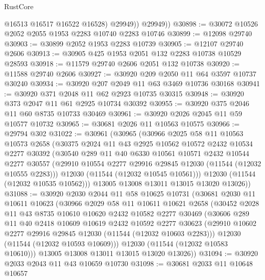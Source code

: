\begin{lexlean}{RustCore}
\begin{coremodule}
              @16513
              @16517
              @16522
              @16528)
            @29949))
        @29949))
@30898 := @30072 @10526 @2052 @2055 @1953 @2283 @10740 @2283 @10746
@30899 := @12098 @29740
@30903 := @30899 @2052 @1953 @2283 @10739
@30905 := @12107 @29740 @2606
@30913 := @30905 @425 @1953 @2051 @132 @2283 @10738 @10529 @28593
@30918 := @11579 @29740 @2606 @2051 @132 @10738
@30920 := @11588 @29740 @2606
@30927 := @30920 @209 @2050 @11 @64 @3597 @10737 @30240
@30934 := @30920 @207 @2049 @11 @63 @3469 @10736 @30168
@30941 := @30920 @371 @2048 @11 @62 @2923 @10735 @30315
@30948 := @30920 @373 @2047 @11 @61 @2925 @10734 @30392
@30955 := @30920 @375 @2046 @11 @60 @8735 @10733 @30469
@30961 := @30920 @2026 @2045 @11 @59 @10577 @10732
@30965 := @30681 @2026 @11 @10563 @10575
@30966 := @29794 @302
@31022 := @30961
    (@30965
      (@30966
        @2025
        @58
        @11
        @10563
        @10573
        @2658
        (@30375
          @2024
          @11
          @43
          @2925
          @10562
          @10572
          @2432
          @10534
          @2277
          @30392
          (@30540
            @289
            @11
            @40
            @6330
            @10561
            @10571
            @2432
            @10544
            @2277
            @30557
            (@29910 @10554 @2277 @29916 @29845 @12030 (@11544 (@12032 @10555 @2283)))
            @12030
            (@11544 (@12032 @10545 @10561)))
          @12030
          (@11544 (@12032 @10535 @10562)))
        @13005
        @13008
        @13011
        @13015
        @13020
        @13026))
@31088 := @30920
    @2030
    @2044
    @11
    @58
    @10625
    @10731
    (@30681
      @2030
      @11
      @10611
      @10623
      (@30966
        @2029
        @58
        @11
        @10611
        @10621
        @2658
        (@30452
          @2028
          @11
          @43
          @8735
          @10610
          @10620
          @2432
          @10582
          @2277
          @30469
          (@30606
            @289
            @11
            @40
            @2418
            @10609
            @10619
            @2432
            @10592
            @2277
            @30623
            (@29910 @10602 @2277 @29916 @29845 @12030 (@11544 (@12032 @10603 @2283)))
            @12030
            (@11544 (@12032 @10593 @10609)))
          @12030
          (@11544 (@12032 @10583 @10610)))
        @13005
        @13008
        @13011
        @13015
        @13020
        @13026))
@31094 := @30920 @2033 @2043 @11 @43 @10659 @10730
@31098 := @30681 @2033 @11 @10648 @10657

\end{coremodule}
\end{lexlean}
